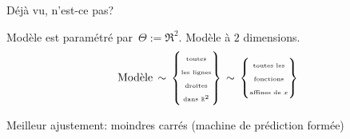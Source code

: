\begin{frame}{\Large D\'ej\`a vu, n'est-ce pas?\quad{}}
\begin{multicols}{2}
\begin{flushright}
\begin{minipage}{4.5cm}
	\pause
	\begin{center}
	Mod\`ele est param\'etr\'e par \,$\Theta := \Re^{2}$.
	\vskip 0.1cm
	Mod\`ele \`a $2$ dimensions.
	\pause
	\begin{equation*}
	\textnormal{Mod\`ele}
	\,\sim\,
	\left\{\!\!\!\begin{array}{c}
	\textnormal{\tiny toutes} \\ \textnormal{\tiny les lignes} \\ \textnormal{\tiny droites} \\ \textnormal{\tiny dans $\Re^{2}$}
	\end{array}\!\!\!\right\}
	\,\sim\,
	\left\{\!\!\!\begin{array}{c}
	\textnormal{\tiny toutes les} \\ \textnormal{\tiny fonctions} \\ \textnormal{\tiny affines de $x$}
	\end{array}\!\!\!\right\}
	\end{equation*}
	\end{center}

	\pause\pause\pause
	\begin{center}
	\vskip -0.1cm
	{\large Meilleur ajustement: moindres carr\'es}
	\vskip 0.2cm
	\pause
	{\small(machine de pr\'ediction form\'ee)}
	\end{center}

	\end{minipage}
	\end{flushright}

\end{multicols}

\end{frame}
\normalsize


